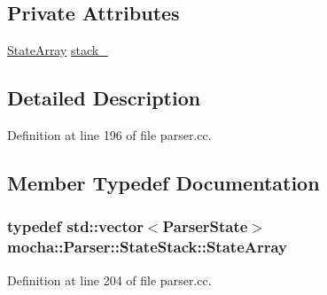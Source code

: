 \subsection*{Private Attributes}
\begin{DoxyCompactItemize}
\item 
\hyperlink{classmocha_1_1_parser_1_1_state_stack_a06d3744ffd5b27d0551fe6ef56cb5e31}{StateArray} \hyperlink{classmocha_1_1_parser_1_1_state_stack_a9761446601dc3ec85846d28cf346a5f4}{stack\_\-}
\end{DoxyCompactItemize}


\subsection{Detailed Description}


Definition at line 196 of file parser.cc.



\subsection{Member Typedef Documentation}
\hypertarget{classmocha_1_1_parser_1_1_state_stack_a06d3744ffd5b27d0551fe6ef56cb5e31}{
\subsubsection[{StateArray}]{\setlength{\rightskip}{0pt plus 5cm}typedef std::vector$<${\bf ParserState}$>$ {\bf mocha::Parser::StateStack::StateArray}}}
\label{classmocha_1_1_parser_1_1_state_stack_a06d3744ffd5b27d0551fe6ef56cb5e31}


Definition at line 204 of file parser.cc.



